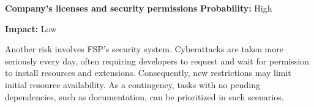 \noindent\textbf{Company's licenses and security permissions} \hfill \textbf{Probability:} High
 
\hfill \textbf{Impact:} Low

Another risk involves FSP's security system. Cyberattacks are taken more seriously every day, often requiring developers to request and wait for permission to install resources and extensions. Consequently, new restrictions may limit initial resource availability. As a contingency, tasks with no pending dependencies, such as documentation, can be prioritized in such scenarios.
